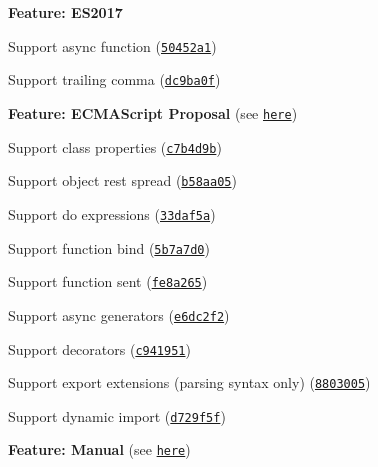 \begin{DoxyItemize}
\begin{DoxyItemize}
\end{DoxyItemize}
\item {\bfseries Feature\+: E\+S2017}
\begin{DoxyItemize}
\item Support {\ttfamily async function} (\href{https://github.com/esdoc/esdoc/commit/50452a1e44a1c8908da1fb377d3aa51eba220256}{\tt 50452a1})
\item Support {\ttfamily trailing comma} (\href{https://github.com/esdoc/esdoc/commit/dc9ba0fd904adbc1519f27c15fab104f1a4414a5}{\tt dc9ba0f})
\end{DoxyItemize}
\item {\bfseries Feature\+: E\+C\+M\+A\+Script Proposal} (see \href{https://esdoc.org/manual/usage/feature.html#ecmascript-proposal}{\tt here})
\begin{DoxyItemize}
\item Support {\ttfamily class properties} (\href{https://github.com/esdoc/esdoc/commit/c7b4d9b415812cf18c451b1a452c9725593d3891}{\tt c7b4d9b})
\item Support {\ttfamily object rest spread} (\href{https://github.com/esdoc/esdoc/commit/b58aa054620e7335d7dcf8e0c81d4cb221e1fc6e}{\tt b58aa05})
\item Support {\ttfamily do expressions} (\href{https://github.com/esdoc/esdoc/commit/33daf5a89dcdd3cd72a3d8b74829861f2c08e18e}{\tt 33daf5a})
\item Support {\ttfamily function bind} (\href{https://github.com/esdoc/esdoc/commit/5b7a7d06028e432d1e23b43963905c1a76b102b2}{\tt 5b7a7d0})
\item Support {\ttfamily function sent} (\href{https://github.com/esdoc/esdoc/commit/fe8a2656a93cfae51c0a541f291f3f32330aec3b}{\tt fe8a265})
\item Support {\ttfamily async generators} (\href{https://github.com/esdoc/esdoc/commit/e6dc2f2cd00bff0e24f71a7485baedb79949ee94}{\tt e6dc2f2})
\item Support {\ttfamily decorators} (\href{https://github.com/esdoc/esdoc/commit/c9419512b7dda5e8f0b906945fb2a91f0b4621b3}{\tt c941951})
\item Support {\ttfamily export extensions} (parsing syntax only) (\href{https://github.com/esdoc/esdoc/commit/8803005b5927615027939ed42633bb06d060adaa}{\tt 8803005})
\item Support {\ttfamily dynamic import} (\href{https://github.com/esdoc/esdoc/commit/d729f5f4e6ad7d7693888b43ab5d42cb78bc15dd}{\tt d729f5f})
\end{DoxyItemize}
\item {\bfseries Feature\+: Manual} (see \href{https://esdoc.org/manual/usage/feature.html#integration-manual}{\tt here})

\end{DoxyItemize}
